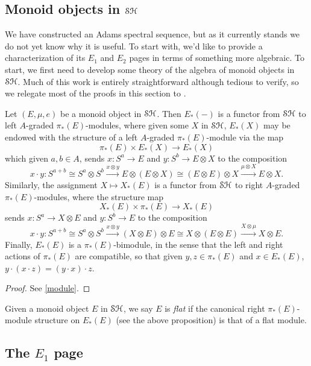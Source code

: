 \documentclass[../main.tex]{subfiles}
\begin{document}
\subsection{Monoid objects in \texorpdfstring{$\mathcal{SH}$}{TEXT}}

We have constructed an Adams spectral sequence, but as it currently stands we do not yet know why it is useful. To start with, we'd like to provide a characterization of its $E_1$ and $E_2$ pages in terms of something more algebraic. To start, we first need to develop some theory of the algebra of monoid objects in $\mathcal{SH}$. Much of this work is entirely straightforward although tedious to verify, so we relegate most of the proofs in this section to .

\begin{proposition}
	Let $(E,\mu,e)$ be a monoid object in $\mathcal{SH}$. Then $E_*(-)$ is a functor from $\mathcal{SH}$ to left $A$-graded $\pi_*(E)$-modules, where given some $X$ in $\mathcal{SH}$, $E_*(X)$ may be endowed with the structure of a left $A$-graded $\pi_*(E)$-module via the map 
	\[\pi_*(E)\times E_*(X)\to E_*(X)\]
	which given $a,b\in A$, sends $x:S^a\to E$ and $y:S^b\to E\otimes X$ to the composition
	\[x\cdot y:S^{a+b}\cong S^a\otimes S^b\xrightarrow{x\otimes y}E\otimes (E\otimes X)\cong (E\otimes E)\otimes X\xrightarrow{\mu\otimes X}E\otimes X.\]
	Similarly, the assignment $X\mapsto X_*(E)$ is a functor from $\mathcal{SH}$ to right $A$-graded $\pi_*(E)$-modules, where the structure map
	\[X_*(E)\times\pi_*(E)\to X_*(E)\]
	sends $x:S^a\to X\otimes E$ and $y:S^b\to E$ to the composition
	\[x\cdot y:S^{a+b}\cong S^a\otimes S^b\xrightarrow{x\otimes y}(X\otimes E)\otimes E\cong X\otimes(E\otimes E)\xrightarrow{X\otimes\mu}X\otimes E.\]
	Finally, $E_*(E)$ is a $\pi_*(E)$-bimodule, in the sense that the left and right actions of $\pi_*(E)$ are compatible, so that given $y, z\in\pi_*(E)$ and $x\in E_*(E)$, $y\cdot(x\cdot z)=(y\cdot x)\cdot z$.
\end{proposition}
\begin{proof}
	See \autoref{module}.
\end{proof}

\begin{definition}\label{flat}
	Given a monoid object $E$ in $\mathcal{SH}$, we say $E$ is \emph{flat} if the canonical right $\pi_*(E)$-module structure on $E_*(E)$ (see the above proposition) is that of a flat module.
\end{definition}

\subsection{The \texorpdfstring{$E_1$}{TEXT} page}
\end{document}

